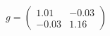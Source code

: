 \documentclass[preview]{standalone}
\begin{document}
\begin{align*}
g = \begin{pmatrix} 1.01 & -0.03 \\ -0.03 & 1.16 \end{pmatrix}
\end{align*}
\end{document}
